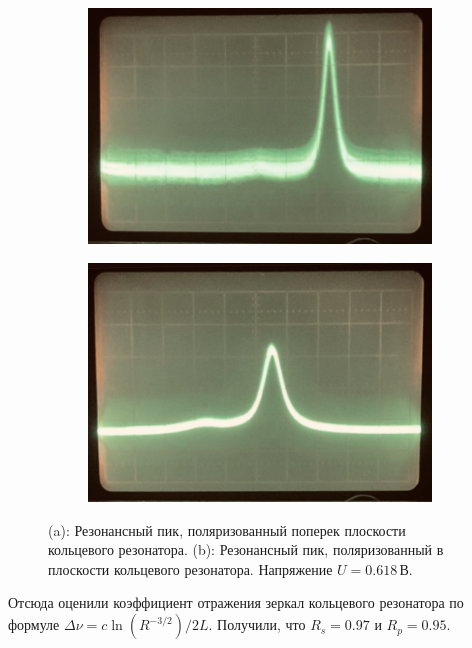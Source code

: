 \documentclass[12pt, russian, a4paper]{article}
\begin{document}
	\begin{figure} 
    	\centering
    	\begin{subfigure}[tb]{.49\textwidth}
			\centering
		 	\includegraphics[width=\textwidth]{../images/6.PNG}
			\caption{}
			\label{fig:res-6}
		\end{subfigure}
    	\hfill
    	\begin{subfigure}[tb]{.49\textwidth}
			\centering
			\includegraphics[width=\textwidth]{../images/7.PNG}
			\caption{}
			\label{fig:res-7}
		\end{subfigure}
     	\caption{(a): Резонансный пик, поляризованный поперек плоскости кольцевого резонатора. (b): Резонансный пик, поляризованный в плоскости кольцевого резонатора. Напряжение $U=0.618\,\text{В}$.}
     	\label{fig:res}
	\end{figure}

	Отсюда оценили коэффициент отражения зеркал кольцевого резонатора по формуле $\Delta \nu = c \ln(R^{-3/2})/2L$. Получили, что $R_s = 0.97$ и $R_p = 0.95$.
\end{document}
